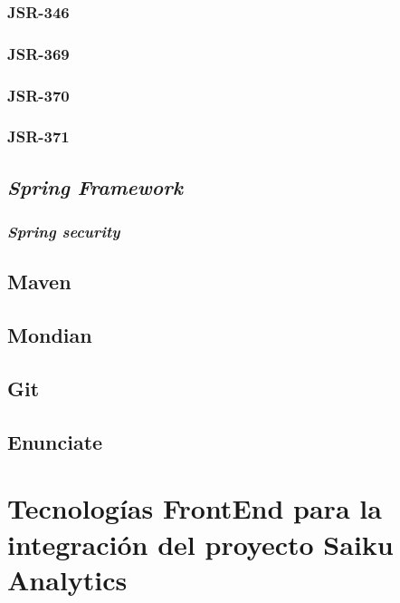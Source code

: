 \begin{spacing}{1.5}
		\subsubsection{JSR-346}
				\lipsum[1-2]
		\subsubsection{JSR-369}
				\lipsum[1-2]
		\subsubsection{JSR-370}
		\lipsum[1-2]
		\subsubsection{JSR-371}
		\lipsum[1-2]
	\subsection{\textit{Spring Framework}}
			\lipsum[1-2]
		\subsubsection{\textit{Spring security}}
				\lipsum[1-2]
	\subsection{Maven}
			\lipsum[1-2]
	\subsection{Mondian}
			\lipsum[1-2]
	\subsection{Git}
			\lipsum[1-2]
	\subsection{Enunciate}
			\lipsum[1-2]
\section{Tecnolog\'{i}as FrontEnd para la integraci\'{o}n
		 del proyecto Saiku Analytics}
		\lipsum[1-2]

\end{spacing}
